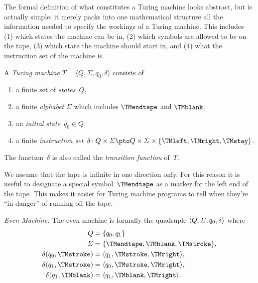 \documentclass[../../../include/open-logic-section]{subfiles}
\begin{document}

\begin{explain}
The formal definition of what constitutes a Turing machine looks
abstract, but is actually simple: it merely packs into one
mathematical structure all the information needed to specify the
workings of a Turing machine. This includes (1) which states the
machine can be in, (2) which symbols are allowed to be on the tape, (3)
which state the machine should start in, and (4) what the instruction
set of the machine is.
\end{explain}

\begin{defn}
A \emph{Turing machine} $T = \langle Q, \Sigma, q_0, \delta\rangle$ consists of
\begin{enumerate}
\item a finite set of \emph{states}~$Q$,
\item a finite \emph{alphabet} $\Sigma$ which includes $\TMendtape$ and
  $\TMblank$,
\item an \emph{initial state}~$q_0 \in Q$,
\item a finite \emph{instruction set}~$\delta\colon Q \times \Sigma
  \pto Q \times \Sigma \times \{\TMleft, \TMright, \TMstay\}$.
\end{enumerate}
The function~$\delta$ is also called the \emph{transition function} of~$T$.
\end{defn}

\begin{explain}
We assume that the tape is infinite in one direction only. For this
reason it is useful to designate a special symbol~$\TMendtape$ as
a marker for the left end of the tape. This makes it easier for
Turing machine programs to tell when they're ``in danger'' of running
off the tape. 
\end{explain}

\begin{ex}
\emph{Even Machine:} The even machine is formally
the quadruple $\langle Q, \Sigma, q_0, \delta \rangle$ where
\begin{align*}
Q & = \{ q_0, q_1 \} \\
\Sigma & = \{ \TMendtape, \TMblank, \TMstroke \}, \\
\delta(q_0, \TMstroke) & = \tuple{q_1, \TMstroke, \TMright},\\
\delta(q_1, \TMstroke) & = \tuple{q_0, \TMstroke, \TMright},\\
\delta(q_1, \TMblank)  & = \tuple{q_1, \TMblank, \TMright}.
\end{align*}
\end{ex}
\end{document}
